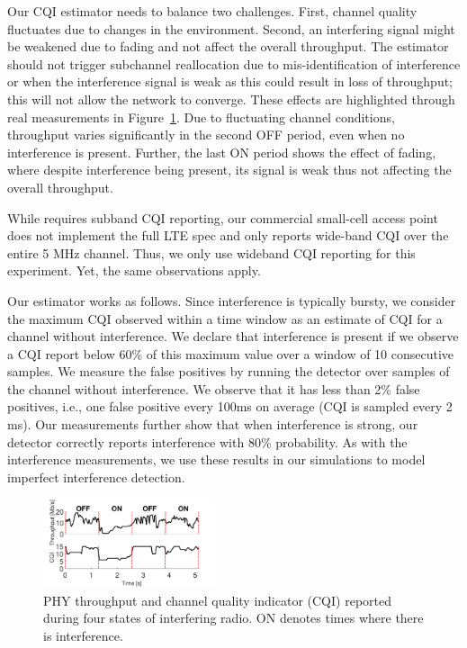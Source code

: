 Our CQI estimator needs to balance two challenges. First, channel quality fluctuates due to changes in the environment.
Second, an interfering signal might be weakened due to fading and not affect the overall throughput. 
The estimator should not trigger subchannel reallocation due to mis-identification of interference or when 
the interference signal is weak as this could result in loss of throughput; this will not allow the network to converge. 
These effects are highlighted through real measurements in Figure~\ref{fig:interf_control_time}. 
Due to fluctuating channel conditions, throughput varies significantly in the second OFF period, even when no interference is present.
Further, the last ON period shows the effect of fading, where despite interference being present, its signal is weak thus not affecting the overall throughput.

While \cf requires subband CQI reporting, our commercial small-cell access point does not implement the full LTE spec 
and only reports wide-band CQI over the entire 5 MHz channel. Thus, we only use wideband CQI reporting for this experiment. 
Yet, the same observations apply.

Our estimator works as follows. Since interference is typically bursty, we consider the maximum CQI observed within a time window as an estimate of CQI for a channel without interference. 
We declare that interference is present if we observe a CQI report below 60\% of this maximum value over a window of 10 consecutive samples. 
We measure the false positives by running the detector over samples of the channel without interference. 
We observe that it has less than 2\% false positives, i.e., one false positive every 100ms on average
(CQI is sampled every 2 ms). 
Our measurements further show that when interference is strong, our detector correctly reports interference with 80\% probability.
As with the interference measurements, we use these results in our simulations to model imperfect interference detection. 


\begin{figure}[t]
\vspace{-10pt}
  \centering
    \includegraphics[width=0.45\textwidth]{./figs/cqi_time.pdf}
    \vspace{-0.15in}
  \caption{\small{PHY throughput and channel quality indicator (CQI) reported during four states of interfering radio. 
ON denotes times where there is interference. }}
\vspace{-0.22in}

  \label{fig:interf_control_time}
\end{figure}

